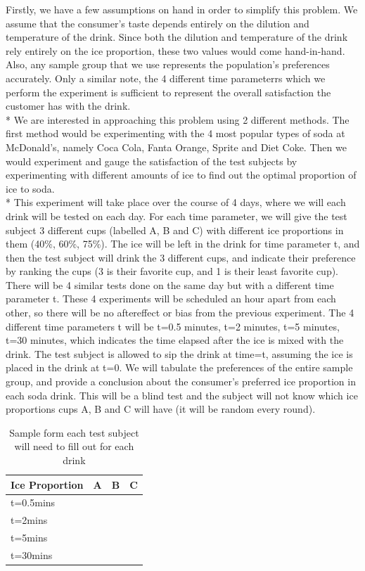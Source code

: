 \documentclass[oneside,12pt]{report}
\begin{document}
Firstly, we have a few assumptions on hand in order to simplify this problem. We assume that the consumer's taste depends entirely on the dilution and temperature of the drink. Since both the dilution and temperature of the drink rely entirely on the ice proportion, these two values would come hand-in-hand. Also, any sample group that we use represents the population's preferences accurately. Only a similar note, the 4 different time parameterrs which we perform the experiment is sufficient to represent the overall satisfaction the customer has with the drink.
\\* We are interested in approaching this problem using 2 different methods. The first method would be experimenting with the 4 most popular types of soda at McDonald's, namely Coca Cola, Fanta Orange, Sprite and Diet Coke. Then we would experiment and gauge the satisfaction of the test subjects by experimenting with different amounts of ice to find out the optimal proportion of ice to soda. 
\\* This experiment will take place over the course of 4 days, where we will each drink will be tested on each day. For each time parameter, we will give the test subject 3 different cups (labelled A, B and C) with different ice proportions in them (40\%, 60\%, 75\%). The ice will be left in the drink for time parameter t, and then the test subject will drink the 3 different cups, and indicate their preference by ranking the cups (3 is their favorite cup, and 1 is their least favorite cup). There will be 4 similar tests done on the same day but with a different time parameter t. These 4 experiments will be scheduled an hour apart from each other, so there will be no aftereffect or bias from the previous experiment. 
The 4 different time parameters t will be t=0.5 minutes, t=2 minutes, t=5 minutes, t=30 minutes, which indicates the time elapsed after the ice is mixed with the drink. The test subject is allowed to sip the drink at time=t, assuming the ice is placed in the drink at t=0. We will tabulate the preferences of the entire sample group, and provide a conclusion about the consumer's preferred ice proportion in each soda drink.
This will be a blind test and the subject will not know which ice proportions cups A, B and C will have (it will be random every round). \pagebreak
\vspace{2pt}
\begin{table}[ h]
\centering
\begin{tabular}{ l | c|c|c }
  Ice Proportion & A  & B & C  \\
\hline  
t=0.5mins & & &\\ 
\hline  
t=2mins & & &\\ 
\hline  
t=5mins  & & &\\ 
\hline  
t=30mins & & &\\ 
\hline  
   
 \end{tabular}
\caption{Sample form each test subject will need to fill out for each drink}

\end{table}
\end{document}
